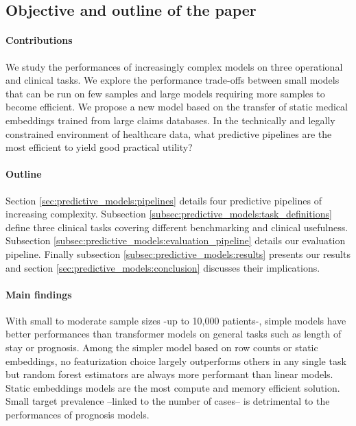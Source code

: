 \documentclass[french,12pt,twoside,a4paper]{book}
\begin{document}
\subsection{Objective and outline of the paper}%
\label{subsec:predictive_models:contribution}%

\paragraph{Contributions}
We study the performances of increasingly complex models on three operational
and clinical tasks. We explore the performance trade-offs between small models
that can be run on few samples and large models requiring more samples to become
efficient. We propose a new model based on the transfer of static medical
embeddings trained from large claims databases. In the technically and legally
constrained environment of healthcare data, what predictive pipelines are the
most efficient to yield good practical utility?

\paragraph{Outline}
Section \ref{sec:predictive_models:pipelines} details four predictive pipelines
of increasing complexity. Subsection
\ref{subsec:predictive_models:task_definitions} define three clinical tasks
covering different benchmarking and clinical usefulness. Subsection
\ref{subsec:predictive_models:evaluation_pipeline} details our evaluation
pipeline. Finally subsection \ref{subsec:predictive_models:results} presents our
results and section \ref{sec:predictive_models:conclusion} discusses their
implications.

\paragraph{Main findings}

With small to moderate sample sizes -up to 10,000 patients-, simple models have
better performances than transformer models on general tasks such as length of
stay or prognosis. Among the simpler model based on row counts or static
embeddings, no featurization choice largely outperforms others in any single
task but random forest estimators are always more performant than linear models.
Static embeddings models are the most compute and memory efficient solution.
Small target prevalence --linked to the number of cases-- is detrimental
to the performances of prognosis models.
\end{document}
